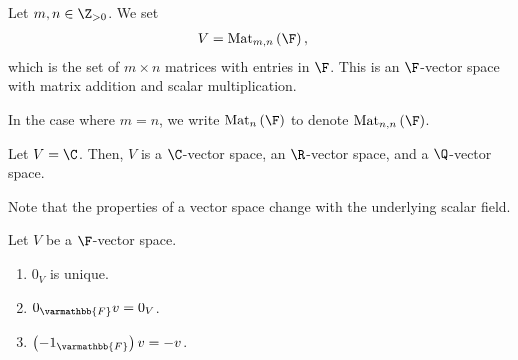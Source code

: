 \documentclass[10pt]{mypackage}
\renewcommand*{\mathbb}[1]{\varmathbb{#1}}
\begin{document}
\begin{example}[Matrices]
  Let $m,n\in \Z_{> 0}$. We set
  \begin{align*}
    V &= \text{Mat}_{m,n}\left(\F\right),
  \end{align*}
  which is the set of $m\times n$ matrices with entries in $\F$. This is an $\F$-vector space with matrix addition and scalar multiplication.\newline

  In the case where $m = n$, we write $\text{Mat}_{n}\left(\F\right)$ to denote $\text{Mat}_{n,n}\left(\F\right)$.
\end{example}
\begin{example}
  Let $V = \C$. Then, $V$ is a $\C$-vector space, an $\R$-vector space, and a $\Q$-vector space.\newline

  Note that the properties of a vector space change with the underlying scalar field.
\end{example}
\begin{lemma}
  Let $V$ be a $\F$-vector space.
  \begin{enumerate}[(1)]
    \item $0_V$ is unique.
    \item $0_{\mathbb{F}}v = 0_V$.
    \item $\left(-1_{\mathbb{F}}\right)v = -v$.
  \end{enumerate}
\end{lemma}
\end{document}
